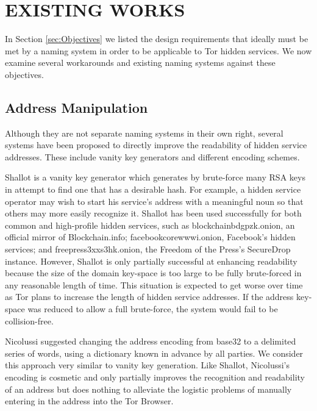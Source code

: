 
\chapter{EXISTING WORKS}
\label{ch:ExistingWorks}

In Section \ref{sec:Objectives} we listed the design requirements that ideally must be met by a naming system in order to be applicable to Tor hidden services. We now examine several workarounds and existing naming systems against these objectives.

\section{Address Manipulation}

Although they are not separate naming systems in their own right, several systems have been proposed to directly improve the readability of hidden service addresses. These include vanity key generators and different encoding schemes.

Shallot is a vanity key generator which generates by brute-force many RSA keys in attempt to find one that has a desirable hash\cite{KatmagicShallot}. For example, a hidden service operator may wish to start his service's address with a meaningful noun so that others may more easily recognize it. Shallot has been used successfully for both common and high-profile hidden services, such as blockchainbdgpzk.onion, an official mirror of Blockchain.info; facebookcorewwwi.onion, Facebook's hidden services; and  freepress3xxs3hk.onion, the Freedom of the Press's SecureDrop instance. However, Shallot is only partially successful at enhancing readability because the size of the domain key-space is too large to be fully brute-forced in any reasonable length of time\cite{KatmagicShallot}. This situation is expected to get worse over time as Tor plans to increase the length of hidden service addresses\cite{Proposal224}. If the address key-space was reduced to allow a full brute-force, the system would fail to be collision-free.

Nicolussi suggested changing the address encoding from base32 to a delimited series of words, using a dictionary known in advance by all parties\cite{nicolussi2011human}. We consider this approach very similar to vanity key generation. Like Shallot, Nicolussi's encoding is cosmetic and only partially improves the recognition and readability of an address but does nothing to alleviate the logistic problems of manually entering in the address into the Tor Browser.

